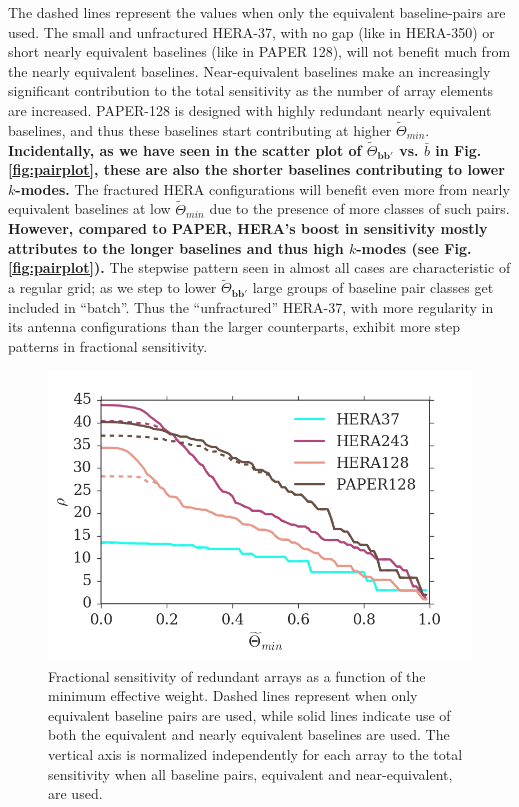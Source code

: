 \documentclass[twocolumn,apj,numberedappendix]{emulateapj}
\renewcommand\[{\begin{equation}}
\renewcommand\]{\end{equation}}
\begin{document}
The dashed lines represent the values when only the equivalent baseline-pairs are used. The small and unfractured HERA-37, with no gap (like in HERA-350) or short nearly equivalent baselines (like in PAPER 128), will not benefit much from the nearly equivalent baselines. Near-equivalent baselines make an increasingly significant contribution to the total sensitivity as the number of array elements are increased. PAPER-128 is designed with highly redundant nearly equivalent baselines, and thus  these baselines start contributing at higher $\widetilde{\Theta}_{min}$. \textbf{Incidentally, as we have seen in the scatter plot of $\widetilde{\Theta}_{\boldsymbol{bb'}}$ vs. $\bar{b}$ in Fig. \ref{fig:pairplot}, these are also the shorter baselines contributing to lower $k$-modes.} The fractured HERA configurations will benefit even more from nearly equivalent baselines at low $\widetilde{\Theta}_{min}$ due to the presence of more classes of such pairs. \textbf{However, compared to PAPER, HERA's boost in sensitivity mostly attributes to the longer baselines and thus high $k$-modes (see Fig. \ref{fig:pairplot}). } The stepwise pattern seen in almost all cases are characteristic of a regular grid; as we step to lower $\widetilde{\Theta}_{\boldsymbol{bb'}}$ large groups of baseline pair classes get included in ``batch''. Thus the ``unfractured'' HERA-37, with more regularity in its antenna configurations than the larger counterparts, exhibit more step patterns in fractional sensitivity. 
\begin{figure}[H]
\includegraphics[width=\linewidth]{osens}
\caption{Fractional sensitivity of redundant arrays as a function of the minimum effective weight. Dashed lines represent when only equivalent baseline pairs are used, while solid lines indicate use of both the equivalent and nearly equivalent baselines are used. The vertical axis is normalized independently for each array to the total sensitivity when all baseline pairs, equivalent and near-equivalent, are used.}
\label{fig:osens}
\end{figure}
\end{document}
